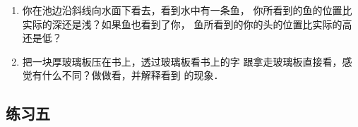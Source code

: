 \begin{enumerate}
    \begin{solution}

    \end{solution}
    \item 你在池边沿斜线向水面下看去，看到水中有一条鱼，
    你所看到的鱼的位置比实际的深还是浅？如果鱼也看到了你，
    鱼所看到的你的头的位置比实际的高还是低？

    \begin{solution}

    \end{solution}
    \item 把一块厚玻璃板压在书上，透过玻璃板看书上的字
    跟拿走玻璃板直接看，感觉有什么不同？做做看，并解释看到
    的现象．

    \begin{solution}

    \end{solution}
\end{enumerate}



\subsection{练习五}

